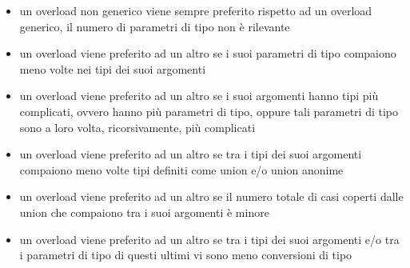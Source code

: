 \begin{itemize}
    \item{
        un overload non generico viene sempre preferito rispetto ad un overload generico, il 
        numero di parametri di tipo non è rilevante
    }
    \item{
        un overload viene preferito ad un altro se i suoi parametri di tipo compaiono 
        meno volte nei tipi dei suoi argomenti
    }
    \item{
        un overload viene preferito ad un altro se i suoi argomenti hanno tipi più complicati, 
        ovvero hanno più parametri di tipo, oppure tali parametri di tipo sono a loro volta, 
        ricorsivamente, più complicati
    }
    \item{
        un overload viene preferito ad un altro se tra i tipi dei suoi argomenti 
        compaiono meno volte tipi definiti come union e/o union anonime
    }
    \item{
        un overload viene preferito ad un altro se il numero totale di casi coperti dalle 
        union che compaiono tra i suoi argomenti è minore
    }
    \item{
        un overload viene preferito ad un altro se tra i tipi dei suoi argomenti e/o tra i 
        parametri di tipo di questi ultimi vi sono meno conversioni di tipo
    }
\end{itemize}